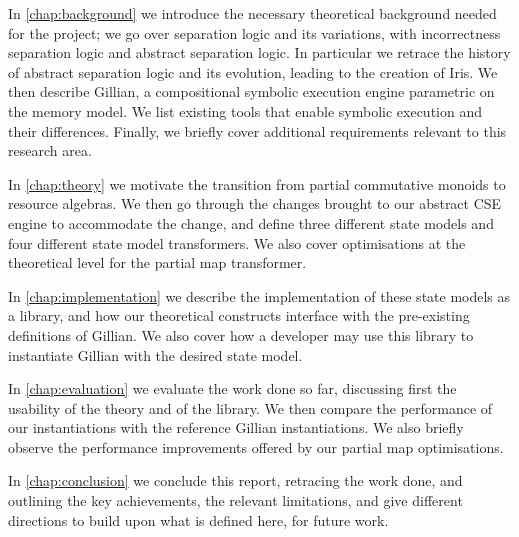 In \autoref{chap:background} we introduce the necessary theoretical background needed for the project; we go over separation logic and its variations, with incorrectness separation logic and abstract separation logic. In particular we retrace the history of abstract separation logic and its evolution, leading to the creation of Iris. We then describe Gillian, a compositional symbolic execution engine parametric on the memory model. We list existing tools that enable symbolic execution and their differences. Finally, we briefly cover additional requirements relevant to this research area.

In \autoref{chap:theory} we motivate the transition from partial commutative monoids to resource algebras. We then go through the changes brought to our abstract CSE engine to accommodate the change, and define three different state models and four different state model transformers. We also cover optimisations at the theoretical level for the partial map transformer.

In \autoref{chap:implementation} we describe the implementation of these state models as a library, and how our theoretical constructs interface with the pre-existing definitions of Gillian. We also cover how a developer may use this library to instantiate Gillian with the desired state model.

In \autoref{chap:evaluation} we evaluate the work done so far, discussing first the usability of the theory and of the library. We then compare the performance of our instantiations with the reference Gillian instantiations. We also briefly observe the performance improvements offered by our partial map optimisations.

In \autoref{chap:conclusion} we conclude this report, retracing the work done, and outlining the key achievements, the relevant limitations, and give different directions to build upon what is defined here, for future work.
